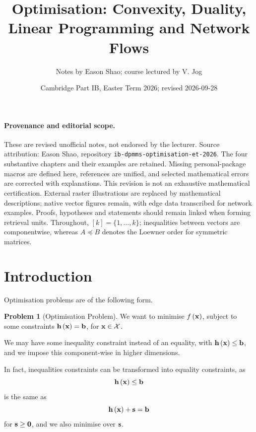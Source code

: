 \documentclass[11pt]{article}
\title{Optimisation: Convexity, Duality, Linear Programming and Network Flows}
\author{Notes by Eason Shao; course lectured by V. Jog}
\date{Cambridge Part IB, Easter Term 2026; revised 2026-09-28}
\theoremstyle{definition}
\newtheorem{problem}[theorem]{Problem}
\theoremstyle{remark}
\newcommand{\pqty}[1]{\left(#1\right)}
\begin{document}
\maketitle
\paragraph{Provenance and editorial scope.}
These are revised unofficial notes, not endorsed by the lecturer.
Source attribution: Eason Shao, repository \texttt{ib-dpmms-optimisation-et-2026}.
The four substantive chapters and their examples are retained. Missing personal-package
macros are defined here, references are unified, and selected mathematical errors are
corrected with explanations. This revision is not an exhaustive mathematical certification.
External raster illustrations are replaced by mathematical descriptions; native vector
figures remain, with edge data transcribed for network examples.
Proofs, hypotheses and statements should remain linked when forming retrieval units.
Throughout, \([k]=\{1,\ldots,k\}\); inequalities between vectors are componentwise,
whereas \(A\preceq B\) denotes the Loewner order for symmetric matrices.
\tableofcontents
\section*{Introduction}

Optimisation problems are of the following form.

\begin{problem}[Optimisation Problem]\label{optim-unit-0001}
    We want to minimise \(f\pqty{\vb{x}}\), subject to some constraints \(\vb{h}\pqty{\vb{x}} = \vb{b}\), for \(\vb{x} \in \mathcal{X}\).
\end{problem}

We may have some inequality constraint instead of an equality, with \(\vb{h}\pqty{\vb{x}} \leq \vb{b}\), and we impose this component-wise in higher dimensions.

In fact, inequalities constraints can be transformed into equality constraints, as
\[
    \vb{h}\pqty{\vb{x}} \leq \vb{b}
\]
is the same as
\[
    \vb{h}\pqty{\vb{x}} + \vb{s} = \vb{b}
\]
for \(\vb{s} \geq \vb{0}\), and we also minimise over \(\vb{s}\).
\end{document}
